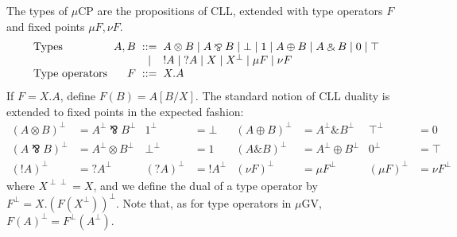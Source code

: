 \documentclass[orivec,envcountsame]{llncs}
\newcommand{\with}{\mathbin\binampersand}
\newcommand{\parr}{\mathbin\bindnasrepma}
\newcommand{\cpdual}[1]{#1^\perp}
\newcommand{\cpbang}[1]{{! #1}}
\newcommand{\cpquery}[1]{{? #1}}
\newcommand{\mucp}{$\mu\mathrm{CP}$\xspace}
\newcommand{\mugv}{$\mu\mathrm{GV}$\xspace}
\begin{document}
The types of \mucp are the propositions of CLL, extended with type operators $F$ and fixed points
$\mu F,\nu F$.
\[\begin{array}{l@{\hspace{2mm}}r@{\hspace{2mm}}c@{\hspace{2mm}}l}
  \text{Types} & A,B & ::= & A \otimes B \mid A \parr B \mid \bot \mid 1 \mid A \oplus B \mid A \with B \mid 0 \mid \top \\
   & & \mid & \cpbang{A} \mid \cpquery{A} \mid X \mid \cpdual{X} \mid \mu F \mid \nu F \\
   \text{Type operators} & F & ::= & X.A %
\end{array}\]
If $F = X.A$, define $F(B) = A[B/X]$.  The standard notion of CLL duality is extended to fixed
points in the expected fashion:
\begin{align*}
  \cpdual{(A \otimes B)} &= \cpdual{A} \parr \cpdual{B} & \cpdual{1} &= \bot &
    \cpdual{(A \oplus B)} &= \cpdual{A} \with \cpdual{B} & \cpdual{\top} &= 0 \\
  \cpdual{(A \parr B)} &= \cpdual{A} \otimes \cpdual{B} & \cpdual{\bot} &= 1 &
    \cpdual{(A \with B)} &= \cpdual{A} \oplus \cpdual{B} & \cpdual{0} &= \top \\
  \cpdual{(\cpbang{A})} &= \cpquery{\cpdual{A}} & \cpdual{(\cpquery{A})} &= \cpbang{\cpdual{A}} &
     \cpdual{(\nu F)} &= \mu \cpdual{F} & \cpdual{(\mu F)} &= \nu \cpdual{F}
\end{align*}
where $X^{\perp\perp}  = X$, and we define the dual of a type operator by $\cpdual{F} =
X.\cpdual{(F(\cpdual{X}))}.$ Note that, as for type operators in \mugv, $\cpdual{F(A)} =
\cpdual{F}(\cpdual{A})$.
\end{document}
